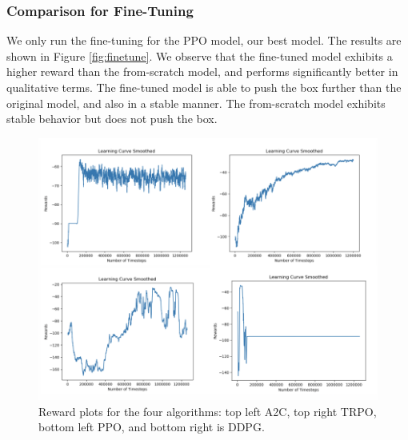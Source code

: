 \documentclass[conference]{IEEEtran}
\begin{document}
\vspace{2mm}
\subsubsection{Comparison for Fine-Tuning}
We only run the fine-tuning for the PPO model, our best model. The results are shown in Figure \ref{fig:finetune}. We observe that the fine-tuned model exhibits a higher reward than the from-scratch model, and performs significantly better in qualitative terms. The fine-tuned model is able to push the box further than the original model, and also in a stable manner. The from-scratch model exhibits stable behavior but does not push the box.

\begin{figure}[h!]
\centering
 \includegraphics[scale=0.55]{curves.png}
 \caption{Reward plots for the four algorithms: top left A2C, top right TRPO, bottom left PPO, and bottom right is DDPG.}
 \label{fig:algos}
\end{figure}
\end{document}
